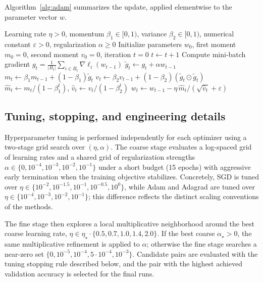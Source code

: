 \documentclass[11pt]{article}
\numberwithin{equation}{section}
\numberwithin{table}{section}
\numberwithin{figure}{section}
\numberwithin{algorithm}{section}
\begin{document}
Algorithm~\ref{alg:adam} summarizes the update, applied elementwise to the parameter vector \(w\).
\begin{algorithm}[H]
\caption{Adam update.}
\label{alg:adam}
\begin{algorithmic}[1]
\Require Learning rate \(\eta>0\), momentum \(\beta_1\in[0,1)\), variance \(\beta_2\in[0,1)\), numerical constant \(\varepsilon>0\), regularization \(\alpha\ge 0\)
\State Initialize parameters \(w_0\), first moment \(m_0=0\), second moment \(v_0=0\), iteration \(t=0\)
\State \(t\gets t+1\)
\State Compute mini-batch gradient \(g_t=\frac{1}{|B_t|}\sum_{i\in B_t}\nabla \ell_i(w_{t-1})\)
\State \(\tilde{g}_t \gets g_t+\alpha w_{t-1}\)
\State \(m_t \gets \beta_1 m_{t-1} + (1-\beta_1) \tilde{g}_t\)
\State \(v_t \gets \beta_2 v_{t-1} + (1-\beta_2) (\tilde{g}_t\odot \tilde{g}_t)\)
\State \(\hat{m}_t \gets m_t/(1-\beta_1^t)\), \quad \(\hat{v}_t \gets v_t/(1-\beta_2^t)\)
\State \(w_t \gets w_{t-1} - \eta\, \hat{m}_t/(\sqrt{\hat{v}_t}+\varepsilon)\)
\EndFor
\end{algorithmic}
\end{algorithm}

\subsection{Tuning, stopping, and engineering details}
Hyperparameter tuning is performed independently for each optimizer using a two-stage grid search over \((\eta,\alpha)\). The coarse stage evaluates a log-spaced grid of learning rates and a shared grid of regularization strengths \(\alpha\in\{0,10^{-4},10^{-3},10^{-2},10^{-1}\}\) under a short budget (15 epochs) with aggressive early termination when the training objective stabilizes. Concretely, SGD is tuned over \(\eta\in\{10^{-2},10^{-1.5},10^{-1},10^{-0.5},10^{0}\}\), while Adam and Adagrad are tuned over \(\eta\in\{10^{-4},10^{-3},10^{-2},10^{-1}\}\); this difference reflects the distinct scaling conventions of the methods.

The fine stage then explores a local multiplicative neighborhood around the best coarse learning rate, \(\eta\in\eta_\star\cdot\{0.5,0.7,1.0,1.4,2.0\}\). If the best coarse \(\alpha_\star>0\), the same multiplicative refinement is applied to \(\alpha\); otherwise the fine stage searches a near-zero set \(\{0,10^{-5},10^{-4},5\cdot 10^{-4},10^{-3}\}\). Candidate pairs are evaluated with the tuning stopping rule described below, and the pair with the highest achieved validation accuracy is selected for the final runs.
\end{document}
